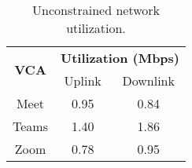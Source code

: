 \begin{table}[t]
\centering
\begin{tabular}{|c|c|c|}
\hline
\multirow{2}{*}{\textbf{VCA}} & 
    \multicolumn{2}{c|}{{\bf Utilization (Mbps)}} \\ 
    \cline{2-3} 
                              & Uplink                   & Downlink                  \\ \hline
Meet                          & 0.95                     & 0.84                      \\ 
Teams                         & 1.40                      & 1.86                      \\ 
Zoom                          & 0.78                     & 0.95                      \\ \hline
\end{tabular}
\caption{Unconstrained network utilization.}
\label{tab:vca_static}
\end{table}


